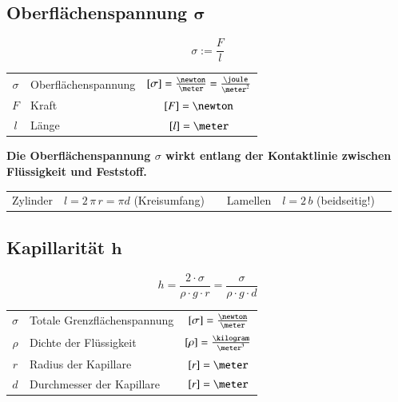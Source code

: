 \subsection[Oberflächenspannung]{Oberflächenspannung $\bm{\sigma}$}

\begin{minipage}[c]{0.3\columnwidth}
    $$ \boxed{ \sigma := \frac{F}{l} } $$ 
\end{minipage}
\hfill
\begin{minipage}[c]{0.65\columnwidth}
    \renewcommand{\arraystretch}{1.3}
    \begin{tabular}{c l c}
    $\sigma$    & Oberflächenspannung   & $[\sigma] = \frac{\newton}{\meter} = \frac{\joule}{\meter^2}$   \\
    $F$         & Kraft                 & $[F] = \newton$                 
      \\
    $l$         & Länge                 & $[l] = \meter$
    \end{tabular}
    \renewcommand{\arraystretch}{1}
\end{minipage}

\medskip

\textbf{Die Oberflächenspannung $\sigma$ wirkt entlang der \textbf{Kontaktlinie} zwischen Flüssigkeit und Feststoff.}

\smallskip

\begin{tabular}{ll c|c ll}
    Zylinder & $l = 2 \, \pi \, r = \pi d$ (Kreisumfang)& &
    Lamellen & $l = 2 \, b$  (beidseitig!)
\end{tabular}


\subsection[Kapillarität]{Kapillarität $\bm{h}$}

\vspace{-0.2cm}

$$\boxed{  h = \frac{2 \cdot \sigma}{\rho \cdot g \cdot r} = \frac{\sigma}{\rho \cdot g \cdot d} }$$ 


\begin{tabular}{c l c}
    $\sigma$    & Totale Grenzflächenspannung   & $[\sigma] = \frac{\newton}{\meter}$   \\
    $\rho$      & Dichte der Flüssigkeit        & $[\rho] = \frac{\kilogram}{\meter^3}$ \\
    $r$         & Radius der Kapillare          & $[r] = \meter$           
             \\
    $d$         & Durchmesser der Kapillare     & $[r] = \meter$ 
\end{tabular}

